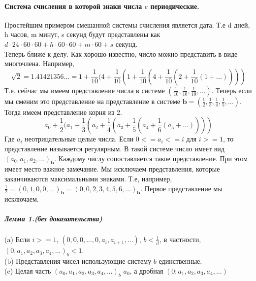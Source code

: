 \documentclass{book}
\begin{document}
\paragraph{Система счисления в которой знаки числа $e$ периодические.\\}
\begin{normalsize}
Простейшим примером смешанной системы счисления является дата. Т.е d дней, h часов, m минут, s секунд будут представлены как $d \cdot 24 \cdot 60 \cdot 60 + h \cdot 60 \cdot 60 + m \cdot 60 + s$ секунд.\\
Теперь ближе к делу. Как хорошо известно, число можно представить в виде многочлена. Например,\\
$$\sqrt{2} = 1.41421356... = 1 + \frac{1}{10}(4+\frac{1}{10}(1+\frac{1}{10}(4+\frac{1}{10}(2+\frac{1}{10}(1+...))))$$
Т.е. сейчас мы имеем представление числа в системе $(\frac{1}{10}, \frac{1}{10}, \frac{1}{10}, ...)$. Теперь если мы сменим это представление на представление в системе $\textbf{b}=(\frac{1}{2}, \frac{1}{3}, \frac{1}{4}, \frac{1}{5}, ...)$. Тогда имеем представление корня из 2.
$$a_0 + \frac{1}{2}(a_1+\frac{1}{3}(a_2+\frac{1}{4}(a_3+\frac{1}{5}(a_4+\frac{1}{6}(a_5+...))))$$
Где  $a_i$ неотрицательные целые числа. Если $0 <= a_i <= i$ для $i >= 1$, то представление называется регулярным. В такой системе число имеет вид $(a_0,a_1,a_2,...)_{\textbf{b}}$. Каждому числу сопоставляется такое представление. При этом имеет место важное замечание. Мы исключаем представления, которые заканчиваются максимальными знаками. Т.е, например, $\frac{1}{2} = (0,1,0,0,...)_{\textbf{b}} = (0,0,2,3,4,5,6,...)_{\textbf{b}}$. Первое представление мы исключаем.
\end{normalsize}
\subparagraph*{Лемма 1.(без доказательства)\\}
\begin{normalsize}
		(a) Если $i >= 1$, $(0,0,0,...,0,a_i,a_{i+1},...)$, $b < \frac{1}{i!}$, в частности, $(0,a_1,a_2,a_3,a_4,...)_b < 1$.\\
		(b) Представления чисел использующие систему $b$ единственные.\\
		(c) Целая часть $(a_0,a_1,a_2,a_3,a_4,...)_b$ $a_0$, а дробная $(0; a_1, a_2, a_3, a_4, ...)$\\\\
\end{normalsize}
\end{document}
